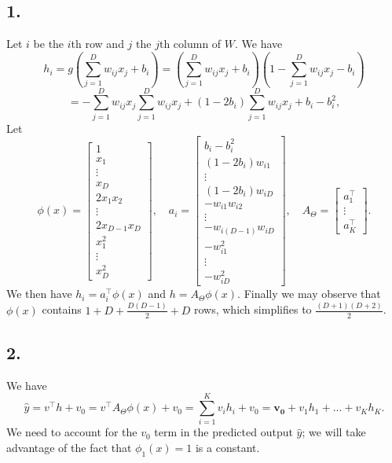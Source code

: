 \documentclass[a4paper, 12pt]{article}
\begin{document}
\subsection*{1.}
Let $i$ be the $i$th row and $j$ the $j$th column of $W$. We have
\[
    h_i = g \left(\sum_{j=1}^{D} w_{ij} x_j +b_i \right )= \left(\sum_{j=1}^{D} w_{ij} x_j +b_i \right ) \left(1-\sum_{j=1}^{D} w_{ij} x_j - b_i \right ) \tag{1}
\]
\[
= - \sum_{j=1}^{D} w_{ij} x_j \sum_{j=1}^{D} w_{ij} x_j + (1-2b_i) \sum_{j=1}^{D} w_{ij} x_j + b_i -b_{i}^2,
\] 
 Let
\[
\phi(x) =
\begin{bmatrix}
    1 \\
    x_1 \\
    \vdots \\
    x_D \\
    2x_1x_2 \\
    \vdots \\
    2x_{D-1}x_D \\
    x_{1}^2 \\
    \vdots \\
     x_{D}^2
\end{bmatrix},
\quad
a_i =
\begin{bmatrix}
    b_i - b_{i}^2  \\
    (1-2b_i) w_{i1}\\
    \vdots \\
    (1-2b_i) w_{iD} \\
    -w_{i1}w_{i2} \\
    \vdots \\
    -w_{i(D-1)}w_{iD} \\
    -w_{i1}^{2} \\
    \vdots \\
    -w_{iD}^{2}
    
\end{bmatrix},
\quad
A_\Theta =
\begin{bmatrix}
    a_1^\top \\
    \vdots \\
    a_K^\top
\end{bmatrix}.
\tag{2}
\]
We then have $h_i = a_i^\top \phi(x)$ and $h = A_\Theta \phi(x)$. Finally we may observe that $\phi(x)$ contains $ 1 + D + \frac{D(D-1)}{2} + D $ rows, which simplifies to $\frac{(D+1)(D+2)}{2}$.

\subsection*{2.}
We have \vspace{-0.5cm} \[
\hat{y} = {v}^\top {h} +v_0 ={v}^\top A_\Theta \phi(x) + v_0 = \sum_{i=1}^{K} v_{i} h_i + v_0 = \boldsymbol{v_0} + v_1h_1 + ... + v_Kh_K. \tag{3}
\]
We need to account for the $v_0$ term in the predicted output $\hat{y}$; we will take advantage of the fact that $\phi_1 (x) = 1$ is a constant.
\end{document}
